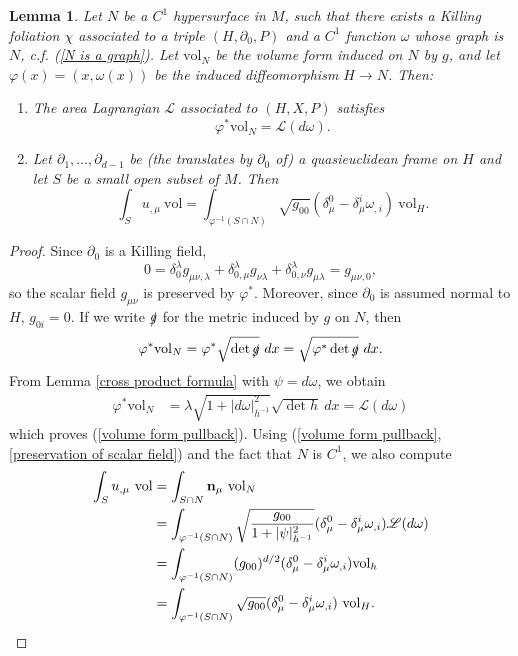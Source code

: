 \documentclass[reqno,12pt,letterpaper]{amsart}
\newcommand{\Lagrange}{\mathscr L}
\newcommand{\normal}{\mathbf n}
\newcommand{\vol}{\mathrm{vol}}
\newtheorem{lemma}[theorem]{Lemma}
\theoremstyle{definition}
\numberwithin{equation}{section}
\begin{document}
\begin{lemma}\label{volume form is Lagrangian}
Let $N$ be a $C^1$ hypersurface in $M$, such that there exists a Killing foliation $\chi$ associated to a triple $(H, \partial_0, P)$ and a $C^1$ function $\omega$ whose graph is $N$, c.f. (\ref{N is a graph}).
Let $\vol_N$ be the volume form induced on $N$ by $g$, and let $\varphi(x) = (x, \omega(x))$ be the induced diffeomorphism $H \to N$.
Then:
\begin{enumerate}
\item The area Lagrangian $\Lagrange$ associated to $(H, X, P)$ satisfies
\begin{equation}\label{volume form pullback}
\varphi^* \vol_N = \Lagrange(d\omega).
\end{equation}
\item Let $\partial_1, \dots, \partial_{d - 1}$ be (the translates by $\partial_0$ of) a quasieuclidean frame on $H$ and let $S$ be a small open subset of $M$. Then
$$\int_S u_{,\mu} ~\vol = \int_{\varphi^{-1}(S \cap N)} \sqrt{g_{00}} (\delta_\mu^0 - \delta^i_\mu \omega_{,i}) ~\vol_H.$$
\end{enumerate}
\end{lemma}
\begin{proof}
Since $\partial_0$ is a Killing field,
\begin{equation}\label{preservation of scalar field}
0 = \delta^\lambda_0 g_{\mu \nu,\lambda} + \delta^\lambda_{0,\mu} g_{\nu\lambda} + \delta^\lambda_{0,\nu} g_{\mu \lambda} = g_{\mu\nu,0},
\end{equation}
so the scalar field $g_{\mu\nu}$ is preserved by $\varphi^*$.
Moreover, since $\partial_0$ is assumed normal to $H$, $g_{0i} = 0$.
If we write $\slashed g$ for the metric induced by $g$ on $N$, then
$$\varphi^* \vol_N = \varphi^* \sqrt{\det \slashed g} ~dx = \sqrt{\varphi^* \det \slashed g} ~dx.$$
From Lemma \ref{cross product formula} with $\psi = d\omega$, we obtain
\begin{align*}
\varphi^* \vol_N &= \lambda\sqrt{1 + |d\omega|_{h^{-1}}^2} \sqrt{\det h} ~dx = \Lagrange(d\omega)
\end{align*}
which proves (\ref{volume form pullback}).
Using (\ref{volume form pullback}, \ref{preservation of scalar field}) and the fact that $N$ is $C^1$, we also compute
\begin{align*}
\int_S u_{,\mu} ~\vol &= \int_{S \cap N} \normal_\mu ~\vol_N \\
&= \int_{\varphi^{-1}(S \cap N)} \sqrt{\frac{g_{00}}{1 + |\psi|_{h^{-1}}^2}} (\delta_\mu^0 - \delta_\mu^i \omega_{,i})\Lagrange(d\omega) \\
&= \int_{\varphi^{-1}(S \cap N)} (g_{00})^{d/2} (\delta_\mu^0 - \delta_\mu^i \omega_{,i}) \vol_h \\
&= \int_{\varphi^{-1}(S \cap N)} \sqrt{g_{00}} (\delta_\mu^0 - \delta_\mu^i \omega_{,i}) ~\vol_H \qedhere.
\end{align*}
\end{proof}
\end{document}
